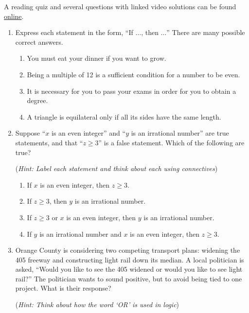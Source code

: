 \begin{exercises}{}{}
	A reading quiz and several questions with linked video solutions can be found \href{http://www.math.uci.edu/~ndonalds/math13/selftest/2-1-props.html}{online}.


	\begin{enumerate}
	  \item Express each statement in the form, ``If $\dots$, then $\dots$'' There are many possible correct answers.
		\begin{enumerate}
		  \item You must eat your dinner if you want to grow.
		  
		  \item Being a multiple of 12 is a sufficient condition for a number to be even.
		  
		  \item It is necessary for you to pass your exams in order for you to obtain a degree. 
		  
		  \item A triangle is equilateral only if all its sides have the same length.
		\end{enumerate}
		
	
	  \item Suppose ``$x$ is an even integer'' and ``$y$ is an irrational number'' are true statements, and that ``$z\geq 3$'' is a false statement. Which of the following are true?\par
	  (\emph{Hint: Label each statement and think about each using connectives})
		\begin{enumerate}
		  \item If $x$ is an even integer, then $z\geq 3$.
		  
		  \item If $z\geq 3$, then $y$ is an irrational number.
		  
		  \item If $z\geq 3$ or $x$ is an even integer, then $y$ is an irrational number.
		  
		  \item If $y$ is an irrational number and $x$ is an even integer, then $z\geq 3$.
		\end{enumerate}


	  \item Orange County is considering two competing transport plans: widening the 405 freeway and constructing light rail down its median. A local politician is asked, ``Would you like to see the 405 widened or would you like to see light rail?'' The politician wants to sound positive, but to avoid being tied to one project. What is their response?\par
	  (\emph{Hint: Think about how the word `OR' is used in logic})
  

\end{enumerate}
\end{exercises}
